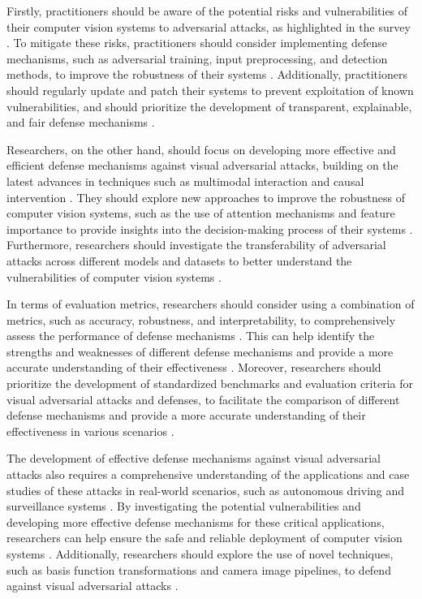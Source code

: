 \documentclass[11pt]{article}
\begin{document}
Firstly, practitioners should be aware of the potential risks and vulnerabilities of their computer vision systems to adversarial attacks, as highlighted in the survey \cite{ref120}. To mitigate these risks, practitioners should consider implementing defense mechanisms, such as adversarial training, input preprocessing, and detection methods, to improve the robustness of their systems \cite{ref44}. Additionally, practitioners should regularly update and patch their systems to prevent exploitation of known vulnerabilities, and should prioritize the development of transparent, explainable, and fair defense mechanisms \cite{ref13}.

Researchers, on the other hand, should focus on developing more effective and efficient defense mechanisms against visual adversarial attacks, building on the latest advances in techniques such as multimodal interaction and causal intervention \cite{ref150}. They should explore new approaches to improve the robustness of computer vision systems, such as the use of attention mechanisms and feature importance to provide insights into the decision-making process of their systems \cite{ref151}. Furthermore, researchers should investigate the transferability of adversarial attacks across different models and datasets to better understand the vulnerabilities of computer vision systems \cite{ref140}.

In terms of evaluation metrics, researchers should consider using a combination of metrics, such as accuracy, robustness, and interpretability, to comprehensively assess the performance of defense mechanisms \cite{ref8}. This can help identify the strengths and weaknesses of different defense mechanisms and provide a more accurate understanding of their effectiveness \cite{ref141}. Moreover, researchers should prioritize the development of standardized benchmarks and evaluation criteria for visual adversarial attacks and defenses, to facilitate the comparison of different defense mechanisms and provide a more accurate understanding of their effectiveness in various scenarios \cite{ref153}.

The development of effective defense mechanisms against visual adversarial attacks also requires a comprehensive understanding of the applications and case studies of these attacks in real-world scenarios, such as autonomous driving and surveillance systems \cite{ref34}. By investigating the potential vulnerabilities and developing more effective defense mechanisms for these critical applications, researchers can help ensure the safe and reliable deployment of computer vision systems \cite{ref152}. Additionally, researchers should explore the use of novel techniques, such as basis function transformations and camera image pipelines, to defend against visual adversarial attacks \cite{ref155} \cite{ref156}.
\end{document}
